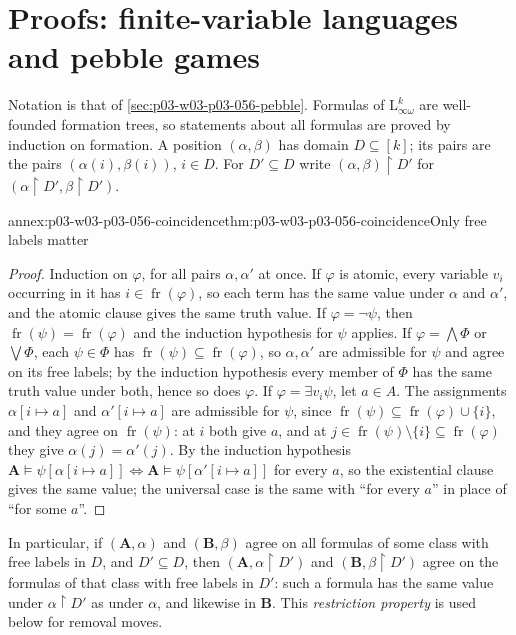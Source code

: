 \section{Proofs: finite-variable languages and pebble games}
\label{sec:annex-p03-w03-p03-056-pebble}

Notation is that of \cref{sec:p03-w03-p03-056-pebble}. Formulas of
\(\mathrm{L}^k_{\infty\omega}\) are well-founded formation trees, so
statements about all formulas are proved by induction on formation. A
position \((\alpha,\beta)\) has domain \(D\subseteq[k]\); its pairs are the
pairs \((\alpha(i),\beta(i))\), \(i\in D\). For \(D'\subseteq D\) write
\((\alpha,\beta)\restriction D'\) for
\((\alpha\restriction D',\beta\restriction D')\).

\begin{annexitem}{annex:p03-w03-p03-056-coincidence}{thm:p03-w03-p03-056-coincidence}{Only free labels matter}
\begin{proof}
Induction on \(\varphi\), for all pairs \(\alpha,\alpha'\) at once.
If \(\varphi\) is atomic, every variable \(v_i\) occurring in it has
\(i\in\operatorname{fr}(\varphi)\), so each term has the same value under
\(\alpha\) and \(\alpha'\), and the atomic clause gives the same truth
value. If \(\varphi=\neg\psi\), then
\(\operatorname{fr}(\psi)=\operatorname{fr}(\varphi)\) and the induction
hypothesis for \(\psi\) applies. If \(\varphi=\bigwedge\Phi\) or
\(\bigvee\Phi\), each \(\psi\in\Phi\) has
\(\operatorname{fr}(\psi)\subseteq\operatorname{fr}(\varphi)\), so
\(\alpha,\alpha'\) are admissible for \(\psi\) and agree on its free labels;
by the induction hypothesis every member of \(\Phi\) has the same truth value
under both, hence so does \(\varphi\). If \(\varphi=\exists v_i\psi\), let
\(a\in A\). The assignments \(\alpha[i\mapsto a]\) and
\(\alpha'[i\mapsto a]\) are admissible for \(\psi\), since
\(\operatorname{fr}(\psi)\subseteq\operatorname{fr}(\varphi)\cup\{i\}\), and
they agree on \(\operatorname{fr}(\psi)\): at \(i\) both give \(a\), and at
\(j\in\operatorname{fr}(\psi)\setminus\{i\}\subseteq\operatorname{fr}(\varphi)\)
they give \(\alpha(j)=\alpha'(j)\). By the induction hypothesis
\(\mathbf A\models\psi[\alpha[i\mapsto a]]\iff
\mathbf A\models\psi[\alpha'[i\mapsto a]]\) for every \(a\), so the
existential clause gives the same value; the universal case is the same
with ``for every \(a\)'' in place of ``for some \(a\)''.
\end{proof}
In particular, if \((\mathbf A,\alpha)\) and \((\mathbf B,\beta)\) agree on
all formulas of some class with free labels in \(D\), and \(D'\subseteq D\),
then \((\mathbf A,\alpha\restriction D')\) and
\((\mathbf B,\beta\restriction D')\) agree on the formulas of that class with
free labels in \(D'\): such a formula has the same value under
\(\alpha\restriction D'\) as under \(\alpha\), and likewise in \(\mathbf B\).
This \emph{restriction property} is used below for removal moves.
\end{annexitem}

